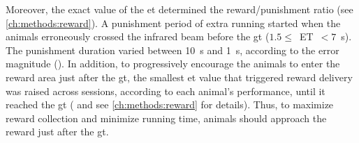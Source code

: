 Moreover, the exact value of the \gls{et} determined the reward/punishment ratio (see \autoref{ch:methods:reward}).
A punishment period of extra running started when the animals erroneously crossed the infrared beam before the \gls{gt} ($1.5\leq$~ET~$<7$~s).
The punishment duration varied between 10~s and 1~s, according to the error magnitude ().
In addition, to progressively encourage the animals to enter the reward area just after the \gls{gt}, the smallest \gls{et} value that triggered reward delivery was raised across sessions, according to each animal's performance, until it reached the \gls{gt} ( and see \autoref{ch:methods:reward} for details).
Thus, to maximize reward collection and minimize running time, animals should approach the reward just after the \gls{gt}.

